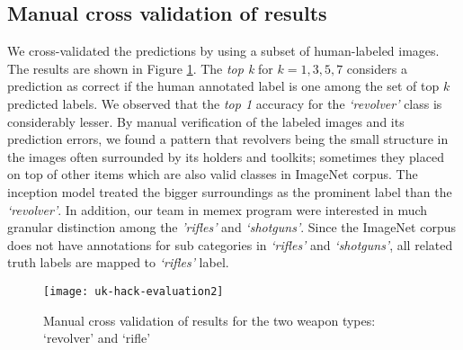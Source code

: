 \subsection{Manual cross validation of results}
We cross-validated the predictions by using a subset of human-labeled images. The results are shown in Figure \ref{fig:uk-hack-eval}. The \textit{top k} for $k=1,3,5,7$ considers a prediction as correct if the human annotated label is one among the set of top $k$  predicted labels. We observed that the \textit{top 1} accuracy for the \textit{`revolver'} class is considerably lesser. By manual verification of the labeled images and its prediction errors, we found a pattern that revolvers being the small structure in the images often surrounded by its holders and toolkits; sometimes they placed on top of other items which are also valid classes in ImageNet corpus. The inception model treated the bigger surroundings as the prominent label than the \textit{`revolver'}. In addition, our team in memex program were interested in much granular distinction among the \textit{'rifles'} and \textit{`shotguns'}. Since the ImageNet corpus does not have annotations for sub categories in \textit{`rifles'} and \textit{`shotguns'}, all related truth labels are mapped to \textit{`rifles'} label. 

\begin{figure}[h]
	\texttt{[image: uk-hack-evaluation2]}
	\caption{Manual cross validation of results for the two weapon types: `revolver' and `rifle'}
	\label{fig:uk-hack-eval}
\end{figure}

